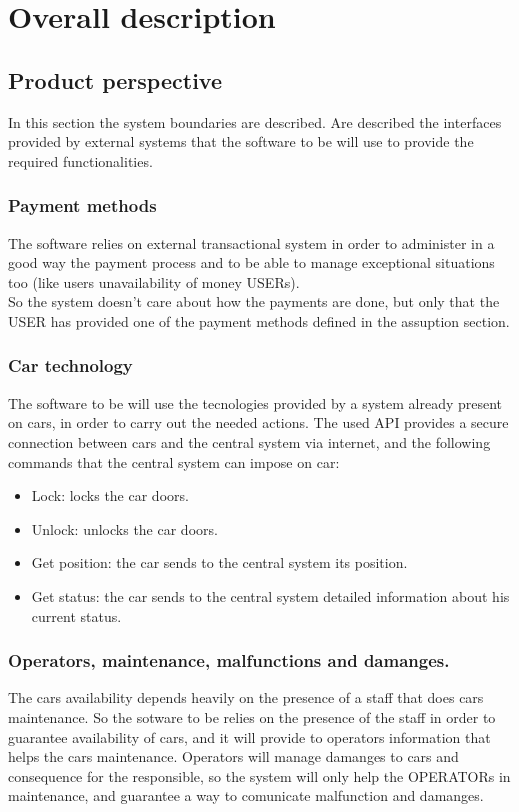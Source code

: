 
\section{Overall description}

\subsection{Product perspective}

In this section the system boundaries are described. Are described
the interfaces provided by external systems that the software to be
will use to provide the required functionalities.

\subsubsection{Payment methods}

The software relies on external transactional system in order to administer
in a good way the payment process and to be able to manage exceptional
situations too (like users unavailability of money USERs). \\
So the system doesn't care about how the payments are done, but only
that the USER has provided one of the payment methods defined in the
assuption section. 

\subsubsection{Car technology}

The software to be will use the tecnologies provided by a system already
present on cars, in order to carry out the needed actions. The used
API provides a secure connection between cars and the central system
via internet, and the following commands that the central system can
impose on car:
\begin{itemize}
\item Lock: locks the car doors.
\item Unlock: unlocks the car doors.
\item Get position: the car sends to the central system its position.
\item Get status: the car sends to the central system detailed information
about his current status.
\end{itemize}

\subsubsection{Operators, maintenance, malfunctions and damanges.}

The cars availability depends heavily on the presence of a staff that
does cars maintenance. So the sotware to be relies on the presence
of the staff in order to guarantee availability of cars, and it will
provide to operators information that helps the cars maintenance.
Operators will manage damanges to cars and consequence for the responsible,
so the system will only help the OPERATORs in maintenance, and guarantee
a way to comunicate malfunction and damanges.
